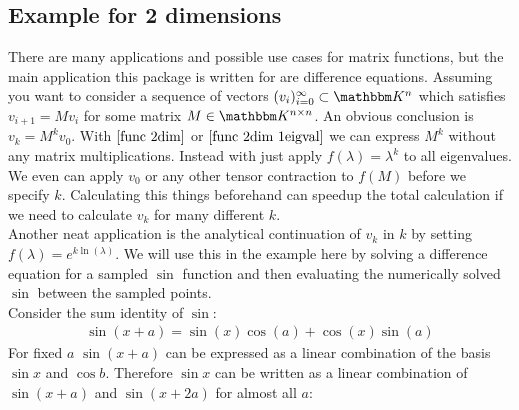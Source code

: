 \documentclass[12pt]{article}
\begin{document}
\subsection{Example for 2 dimensions}
There are many applications and possible use cases for matrix functions, but the main application this package is written for are difference equations. Assuming you want to consider a sequence of vectors $(v_i)_{i=0}^\infty \subset \mathbbm K^n$ which satisfies $v_{i+1} = M v_i$ for some matrix $M\in \mathbbm K^{n\times n}$. An obvious conclusion is $v_k = M^k v_0$. With $\eqref{func 2dim}$ or $\eqref{func 2dim 1eigval}$ we can express $M^k$ without any matrix multiplications. Instead with just apply $f(\lambda) = \lambda^k$ to all eigenvalues. We even can apply $v_0$ or any other tensor contraction to $f(M)$ before we specify $k$. Calculating this things beforehand can speedup the total calculation if we need to calculate $v_k$ for many different $k$.\\
Another neat application is the analytical continuation of $v_k$ in $k$ by setting $f(\lambda) = e^{k \ln(\lambda)}$. We will use this in the example here by solving a difference equation for a sampled $\sin$ function and then evaluating the numerically solved $\sin$ between the sampled points.\\
Consider the sum identity of $\sin$:
\begin{align}
\sin(x+a) = \sin(x)\cos(a) + \cos(x)\sin(a) \label{sin(a+b)}
\end{align}
For fixed $a$ $\sin(x+a)$ can be expressed as a linear combination of the basis $\sin x$ and $\cos b$. Therefore $\sin x$ can be written as a linear combination of $\sin(x+a)$ and $\sin(x+2a)$ for almost all $a$:
\end{document}
